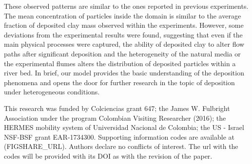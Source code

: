 \documentclass[draft,linenumbers]{agujournal2018}
\begin{document}
These observed patterns are similar to the ones reported in previous experiments. The mean concentration of particles inside the domain is similar to the average fraction of deposited clay mass observed within the experiments. However, some deviations from the experimental results were found, suggesting that even if the main physical processes were captured, the ability of deposited clay to alter flow paths after significant deposition and the heterogeneity of the natural media or the experimental flumes alters the distribution of deposited particles within a river bed. In brief, our model provides the basic understanding of the deposition phenomena and opens the door for further research in the topic of deposition under heterogeneous conditions. 

\acknowledgments
This research was funded by Colciencias grant 647; the James W. Fulbright Association under the program Colombian Visiting Researcher (2016); the HERMES mobility system of Universidad Nacional de Colombia; the US - Israel NSF-BSF grant EAR-1734300. Supporting information codes are available at (FIGSHARE\_URL). Authors declare no conflicts of interest.
The url with the codes will be provided with its DOI as with the revision of the paper. 


\end{document}
